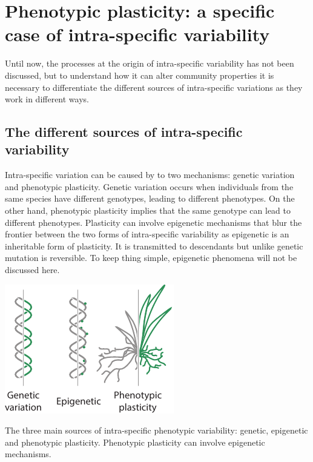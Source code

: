 {%
\section{Phenotypic plasticity: a specific case of intra-specific variability}

Until now, the processes at the origin of intra-specific variability has not been discussed, but to understand how it can alter community properties it is necessary to differentiate the different sources of intra-specific variations as they work in different ways.

\subsection{The different sources of intra-specific variability}

Intra-specific variation can be caused by to two mechanisms: genetic variation and phenotypic plasticity. Genetic variation occurs when individuals from the same species have different genotypes, leading to different phenotypes. On the other hand, phenotypic plasticity implies that the same genotype can lead to different phenotypes. Plasticity can involve epigenetic mechanisms \parencite{
zhang_epigenetic_2013, nicotra_adaptive_2015, beaman_evolution_2016} that blur the frontier between the two forms of intra-specific variability as epigenetic is an inheritable form of plasticity. It is transmitted to descendants but unlike genetic mutation is reversible. To keep thing simple, epigenetic phenomena will not be discussed here.

\begin{marginfigure}
    \includegraphics{./1_Introduction/graphics/sources.pdf}
  \caption[Sources of intra-specific variability]{The three main sources of intra-specific phenotypic variability: genetic, epigenetic and phenotypic plasticity. Phenotypic plasticity can involve epigenetic mechanisms.}
  \label{fg:insurance}
\end{marginfigure}

}
